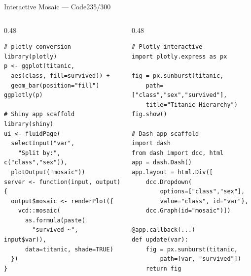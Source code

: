 \documentclass[10pt]{beamer}
\newcommand{\smark}[1]{\hfill{\scriptsize\color{codegray}#1}}
\begin{document}
\begin{frame}[fragile]{Interactive Mosaic --- Code}\smark{235/300}
\begin{columns}[T]
\begin{column}{0.48\textwidth}
\begin{lstlisting}[style=Rstyle]
# plotly conversion
library(plotly)
p <- ggplot(titanic,
  aes(class, fill=survived)) +
  geom_bar(position="fill")
ggplotly(p)

# Shiny app scaffold
library(shiny)
ui <- fluidPage(
  selectInput("var",
    "Split by:", c("class","sex")),
  plotOutput("mosaic"))
server <- function(input, output) {
  output$mosaic <- renderPlot({
    vcd::mosaic(
      as.formula(paste(
        "survived ~", input$var)),
      data=titanic, shade=TRUE)
  })
}
\end{lstlisting}
\end{column}
\begin{column}{0.48\textwidth}
\begin{lstlisting}[style=Pystyle]
# Plotly interactive
import plotly.express as px

fig = px.sunburst(titanic,
    path=["class","sex","survived"],
    title="Titanic Hierarchy")
fig.show()

# Dash app scaffold
import dash
from dash import dcc, html
app = dash.Dash()
app.layout = html.Div([
    dcc.Dropdown(
        options=["class","sex"],
        value="class", id="var"),
    dcc.Graph(id="mosaic")])

@app.callback(...)
def update(var):
    fig = px.sunburst(titanic,
        path=[var, "survived"])
    return fig
\end{lstlisting}
\end{column}
\end{columns}
\end{frame}
\end{document}
